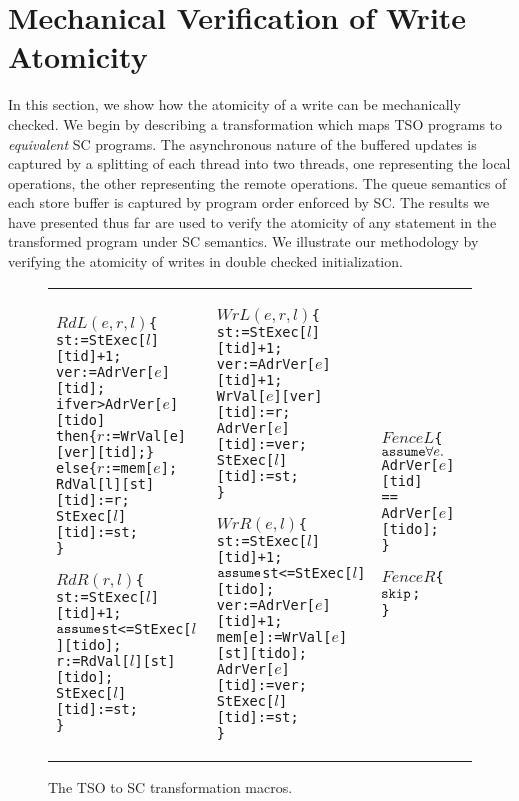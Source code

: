 \documentclass[preprint,9pt]{sigplanconf}
\begin{document}
\section{Mechanical Verification of Write Atomicity}
\label{sec:mechanical-verification}
In this section, we show how the atomicity of a write can be mechanically checked.
We begin by describing a transformation which maps TSO programs to {\em equivalent} SC programs.
The asynchronous nature of the buffered updates is captured by a splitting of each thread into two threads, one representing the local operations, the other representing the remote operations.
The queue semantics of each store buffer is captured by program order enforced by SC.
The results we have presented thus far are used to verify the atomicity of any statement  in the transformed program under SC semantics.
We illustrate our methodology by verifying the atomicity of writes in double checked initialization. 


\begin{figure*}
\begin{tabular}{p{}p{}p{}}
\begin{alltt}\(RdL(e,r,l)\) \{  
 st:=StExec[\(l\)][tid]+1;
 ver:=AdrVer[\(e\)][tid];
 if ver>AdrVer[\(e\)][tido]
 then \{\(r\):=WrVal[e][ver][tid]; \}
 else \{\(r\):=mem[\(e\)];
 RdVal[l][st][tid]:=r;
 StExec[\(l\)][tid]:=st;
\}

\(RdR(r,l)\) \{
 st:=StExec[\(l\)][tid]+1;
 \(\aliassume\) st<=StExec[\(l\)][tido];
 r := RdVal[\(l\)][st][tido];
 StExec[\(l\)][tid]:=st;
\}
\end{alltt} &

\begin{alltt}\(WrL(e,r,l)\) \{
 st:=StExec[\(l\)][tid]+1;
 ver:=AdrVer[\(e\)][tid]+1;
 WrVal[\(e\)][ver][tid]:=r;
 AdrVer[\(e\)][tid]:=ver;
 StExec[\(l\)][tid]:=st;
\}

\(WrR(e,l)\) \{
 st:=StExec[\(l\)][tid]+1;
 \(\aliassume\) st<=StExec[\(l\)][tido];
 ver:=AdrVer[\(e\)][tid]+1;
 mem[e]:=WrVal[\(e\)][st][tido];
 AdrVer[\(e\)][tid]:=ver;
 StExec[\(l\)][tid]:=st;
\}\end{alltt} & 

\begin{alltt}
\(FenceL\) \{
 \(\aliassume \forall e.\) 
   AdrVer[\(e\)][tid]
        ==
   AdrVer[\(e\)][tido];
\}

\(FenceR\) \{
 \(\aliskip\);
\}\end{alltt}
\end{tabular}
\caption{The TSO to SC transformation macros.}
\label{fig:transformation-macros}
\end{figure*}
\end{document}
